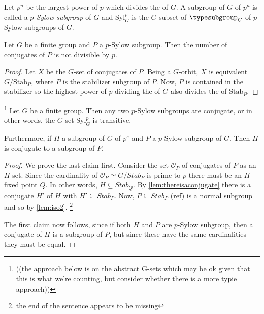 \begin{definition}
  \label{def:sylowsubgroup}
  Let $p^n$ be the largest power of $p$ which divides the \gporder of $G$.  A subgroup of $G$ of \gporder $p^n$ is called a \emph{$p$-Sylow subgroup} of $G$ and $\mathrm{Syl}_G^p$ is the $G$-subset of $\typesubgroup_G$ of $p$-Sylow subgroups of $G$.
\end{definition}
\begin{lemma}
  \label{lem:numberofconjofSylow}
  Let $G$ be a finite group and $P$ a $p$-Sylow subgroup.  Then the number of conjugates of $P$ is not divisible by $p$.
\end{lemma}
\begin{proof}
  Let $X$ be the $G$-set of conjugates of $P$.  Being a $G$-orbit, $X$ is equivalent $G/\mathrm{Stab}_P$, where $P$ is the stabilizer subgroup of $P$.  Now, $P$ is contained in the stabilizer so the highest power of $p$ dividing the \gporder of $G$ also divides the \gporder of $\mathrm{Stab}_P$.
\end{proof}

\begin{theorem}
  \label{thm:sylow2}%
  \label{lem:sylowsareconjugates}\footnote{  ((the approach below is on the abstract G-sets which may be ok given that this is what we're counting, but consider whether there is a more typie approach))}
  Let $G$ be a finite group.  Then any two $p$-Sylow subgroups are conjugate, or in other words,  the $G$-set $\mathrm{Syl}_G^p$ is transitive.

Furthermore, if $H$ a subgroup of $G$ of \gporder $p^s$ and $P$ a $p$-Sylow subgroup of $G$.  Then $H$ is conjugate to a subgroup of $P$.
\end{theorem}

\begin{proof}
  We prove the last claim first.
  Consider the set $\mathcal O_P$ of conjugates of $P$ as an $H$-set.  Since the cardinality of $\mathcal O_P\simeq G/Stab_P$ is prime to $p$ there must be an $H$-fixed point $Q$.  In other words, $H\subseteq Stab_Q$.  By \cref{lem:thereisaconjugate} there is a conjugate $H'$ of $H$ with $H'\subseteq Stab_P$.  Now, $P\subseteq Stab_P$ (ref) is a normal subgroup and so by \cref{lem:iso2}.
  \footnote{the end of the sentence appears to be missing}

The first claim now follows, since if both $H$ and $P$ are $p$-Sylow subgroup, then a conjugate of $H$ is a subgroup of $P$, but since these have the same cardinalities they must be equal.
\end{proof}




